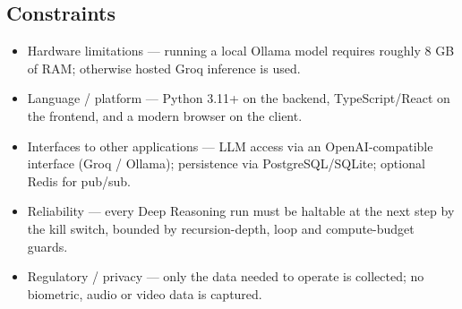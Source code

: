 \documentclass[12pt,a4paper]{report}
\begin{document}
\subsection{Constraints}
\begin{itemize}
  \item Hardware limitations --- running a local Ollama model requires roughly 8 GB of RAM; otherwise hosted Groq inference is used.
  \item Language / platform --- Python 3.11+ on the backend, TypeScript/React on the frontend, and a modern browser on the client.
  \item Interfaces to other applications --- LLM access via an OpenAI-compatible interface (Groq / Ollama); persistence via PostgreSQL/SQLite; optional Redis for pub/sub.
  \item Reliability --- every Deep Reasoning run must be haltable at the next step by the kill switch, bounded by recursion-depth, loop and compute-budget guards.
  \item Regulatory / privacy --- only the data needed to operate is collected; no biometric, audio or video data is captured.
\end{itemize}
\end{document}
